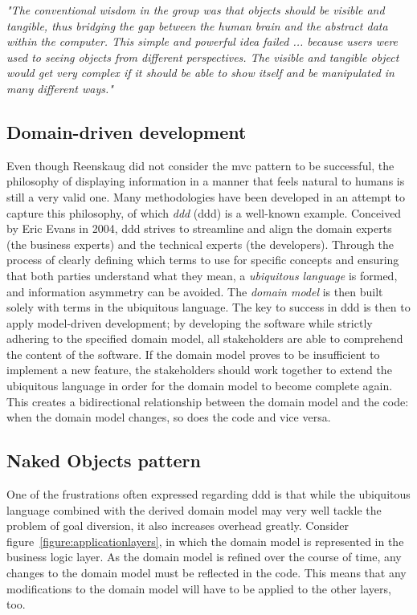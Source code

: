 \begin{displayquote}
\textit{"The conventional wisdom in the group was that objects should be visible and tangible, thus bridging the gap between the human brain and the abstract data within the computer. This simple and powerful idea failed ... because users were used to seeing objects from different perspectives. The visible and tangible object would get very complex if it should be able to show itself and be manipulated in many different ways."}
\end{displayquote}

\subsection{Domain-driven development}
\label{subsection:domaindrivendevelopment}
Even though Reenskaug did not consider the \acrshort{mvc} pattern to be successful, the philosophy of displaying information in a manner that feels natural to humans is still a very valid one. Many methodologies have been developed in an attempt to capture this philosophy, of which \textit{\acrlong{ddd}} (\acrshort{ddd}) is a well-known example. Conceived by Eric Evans in 2004, \acrshort{ddd} strives to streamline and align the domain experts (the business experts) and the technical experts (the developers). Through the process of clearly defining which terms to use for specific concepts and ensuring that both parties understand what they mean, a \textit{ubiquitous language} is formed, and information asymmetry can be avoided\cite{evans2004domain}. The \textit{domain model} is then built solely with terms in the ubiquitous language. The key to success in \acrshort{ddd} is then to apply model-driven development; by developing the software while strictly adhering to the specified domain model, all stakeholders are able to comprehend the content of the software. If the domain model proves to be insufficient to implement a new feature, the stakeholders should work together to extend the ubiquitous language in order for the domain model to become complete again. This creates a bidirectional relationship between the domain model and the code: when the domain model changes, so does the code and vice versa.

\subsection{Naked Objects pattern}
\label{subsection:nakedobjectspattern}
One of the frustrations often expressed regarding \acrshort{ddd} is that while the ubiquitous language combined with the derived domain model may very well tackle the problem of goal diversion, it also increases overhead greatly. Consider figure~\ref{figure:applicationlayers}, in which the domain model is represented in the business logic layer. As the domain model is refined over the course of time, any changes to the domain model must be reflected in the code. This means that any modifications to the domain model will have to be applied to the other layers, too.

